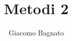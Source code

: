 \documentclass[fontsize=8pt]{scrartcl}
\author{Giacomo Bagnato}
\date{}
\title{Metodi 2}
\begin{document}
\begin{multicols*}{3}
\maketitle













\end{multicols*}
\end{document}
